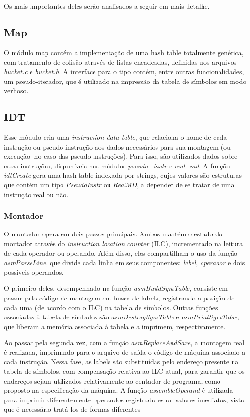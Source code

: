\documentclass[10pt,a4paper]{article}
\numberwithin{equation}{section}
\begin{document}
Os mais importantes deles serão analisados a seguir em mais detalhe.

\subsection{Map}

O módulo map contém a implementação de uma hash table totalmente genérica, com tratamento de colisão através de listas encadeadas, definidas nos arquivos \emph{bucket.c} e \emph{bucket.h}. A interface para o tipo contém, entre outras funcionalidades, um pseudo-iterador, que é utilizado na impressão da tabela de símbolos em modo verboso.

\subsection{IDT}

Esse módulo cria uma \emph{instruction data table}, que relaciona o nome de cada instrução ou pseudo-instrução aos dados necessários para sua montagem (ou execução, no caso das pseudo-instruções). Para isso, são utilizados dados sobre essas instruções, disponíveis nos módulos \emph{pseudo\_instr} e \emph{real\_md}. A função \emph{idtCreate} gera uma hash table indexada por strings, cujos valores são estruturas que contém um tipo \emph{PseudoInstr} ou \emph{RealMD}, a depender de se tratar de uma instrução real ou não.

\subsubsection{Montador}

O montador opera em dois passos principais. Ambos mantém o estado do montador através do \emph{instruction location counter} (ILC), incrementado na leitura de cada operador ou operando. Além disso, eles compartilham o uso da função \emph{asmParseLine}, que divide cada linha em seus componentes: \emph{label}, \emph{operador} e dois possíveis operandos.

O primeiro deles, desempenhado na função \emph{asmBuildSymTable}, consiste em passar pelo código de montagem em busca de labels, registrando a posição de cada uma (de acordo com o ILC) na tabela de símbolos. Outras funções associadas à tabela de símbolos são \emph{asmDestroySymTable} e \emph{asmPrintSymTable}, que liberam a memória associada à tabela e a imprimem, respectivamente.

Ao passar pela segunda vez, com a função \emph{asmReplaceAndSave}, a montagem real é realizada, imprimindo para o arquivo de saída o código de máquina associado a cada instrução. Nessa fase, as labels são substituídas pelo endereço presente na tabela de símbolos, com compensação relativa ao ILC atual, para garantir que os endereços sejam utilizados relativamente ao contador de programa, como proposto na especificação da máquina. A função \emph{assembleOperand} é utilizada para imprimir diferentemente operandos registradores ou valores imediatos, visto que é necessário tratá-los de formas diferentes.
\end{document}
